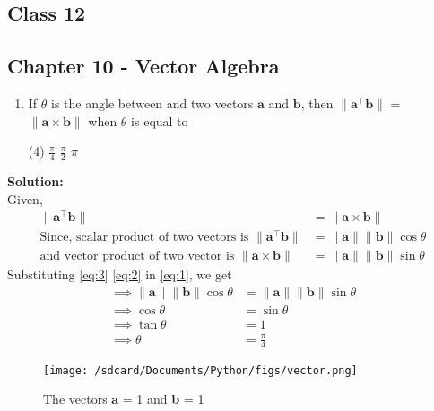 \documentclass{article}
\newcommand{\norm}[1]{\lVert#1\rVert}
\renewcommand{\vec}[1]{\textbf{#1}}
\begin{document}
\onehalfspacing
\begin{center}
  \section*{\textbf{Class 12}}
  \subsection*{Chapter 10 - Vector Algebra}
\end{center}
\begin{enumerate}
  \item If $\theta$ is the angle between and two vectors $\vec{a}$ and $\vec{b}$, then $\norm{\vec{a}^{\top}\vec{b}}$ = $\norm{\vec{a}\times\vec{b}}$ when $\theta$ is equal to
    \begin{tasks}(4)
      \task $\frac{\pi}{4}$
      \task $\frac{\pi}{2}$
      \task $\pi$
      \end{tasks}
\end{enumerate}
  \textbf{Solution:}
  \\
Given,
\begin{align}
  \norm{\vec{a}^{\top}\vec{b}} &= \norm{\vec{a} \times \vec{b}} \label{eq:1}
  \\
  \text{Since, scalar product of two vectors is } \norm{\vec{a}^{\top}\vec{b}} &= \norm{\vec{a}}\norm{\vec{b}}\cos{\theta} \label{eq:2}
  \\
  \text{and vector product of two vector is }\norm{\vec{a} \times \vec{b}} &= \norm{\vec{a}}\norm{\vec{b}}\sin{\theta} \label{eq:3}
\end{align}
Substituting \eqref{eq:3} \eqref{eq:2} in \eqref{eq:1}, we get
\\
\begin{align}
  \implies \norm{\vec{a}}\norm{\vec{b}}\cos{\theta} &= \norm{\vec{a}}\norm{\vec{b}}\sin{\theta}\\
  \implies \cos{\theta} &= \sin{\theta}\\
  \implies \tan{\theta} &= 1\\
  \implies \theta &= \frac{\pi}{4}
\end{align}
\begin{figure}
  \begin{center}
    \texttt{[image: /sdcard/Documents/Python/figs/vector.png]}
  \end{center}
	\caption{The vectors \vec{a} = 1 and \vec{b} = 1}
  \label{fig:12.10.5.19}
\end{figure}
\end{document}
